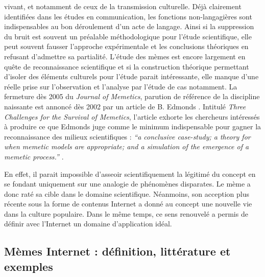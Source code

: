 vivant, et notamment de ceux de la transmission culturelle. Déjà clairement identifiées dans les études en communication, les fonctions non-langagières sont indispensables au bon déroulement d{\textquoteright}un acte de langage. Ainsi si la suppression du bruit est souvent un préalable méthodologique pour l{\textquoteright}étude scientifique, elle peut souvent fausser l{\textquoteright}approche expérimentale et les conclusions théoriques en refusant d{\textquoteright}admettre sa partialité. L{\textquoteright}étude des mèmes est encore largement en quête de reconnaissance scientifique et si la construction théorique permettant d{\textquoteright}isoler des éléments culturels pour l{\textquoteright}étude parait intéressante, elle manque d{\textquoteright}une réelle prise sur l{\textquoteright}observation et l{\textquoteright}analyse par l{\textquoteright}étude de cas notamment. La fermeture dès 2005 du \textit{Journal of Memetics}, parution de référence de la discipline naissante est annoncé dès 2002 par un article de B. Edmonds \citep{Jouxtel2014}. Intitulé \textit{Three Challenges for the Survival of Memetics}, l{\textquoteright}article\textit{ }exhorte les chercheurs intéressés à produire ce que Edmonds juge comme le minimum indispensable pour gagner la reconnaissance des milieux scientifiques : \textit{``a conclusive case-study; a theory for when memetic models are appropriate; and a simulation of the emergence of a memetic process.''} \citep{Edmonds2002}.  

En effet, il parait impossible d{\textquoteright}asseoir scientifiquement la légitimé du concept en se fondant uniquement sur une analogie de phénomènes disparates. Le mème a donc raté sa cible dans le domaine scientifique. Néanmoins, son acception plus récente sous la forme de contenus Internet a donné au concept une nouvelle vie dans la culture populaire. Dans le même temps, ce sens renouvelé a permis de définir avec l'Internet un domaine d{\textquoteright}application idéal. 

\subsection[Mèmes Internet : définition, littérature et exemples]{Mèmes Internet : définition, littérature et exemples}

